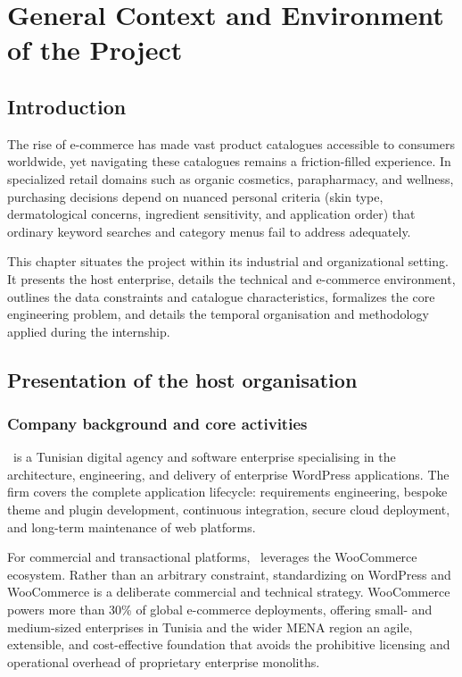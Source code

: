 ﻿%

\chapter{General Context and Environment of the Project}

\section{Introduction}

The rise of e-commerce has made vast product catalogues accessible to consumers worldwide, yet navigating these catalogues remains a friction-filled experience. In specialized retail domains such as organic cosmetics, parapharmacy, and wellness, purchasing decisions depend on nuanced personal criteria (skin type, dermatological concerns, ingredient sensitivity, and application order) that ordinary keyword searches and category menus fail to address adequately.

This chapter situates the project within its industrial and organizational setting. It presents the host enterprise, details the technical and e-commerce environment, outlines the data constraints and catalogue characteristics, formalizes the core engineering problem, and details the temporal organisation and methodology applied during the internship.

\section{Presentation of the host organisation}

\subsection{Company background and core activities}

\companyname\ is a Tunisian digital agency and software enterprise specialising in the architecture, engineering, and delivery of enterprise WordPress applications. The firm covers the complete application lifecycle: requirements engineering, bespoke theme and plugin development, continuous integration, secure cloud deployment, and long-term maintenance of web platforms.

For commercial and transactional platforms, \companyname\ leverages the WooCommerce ecosystem. Rather than an arbitrary constraint, standardizing on WordPress and WooCommerce is a deliberate commercial and technical strategy. WooCommerce powers more than 30\% of global e-commerce deployments, offering small- and medium-sized enterprises in Tunisia and the wider MENA region an agile, extensible, and cost-effective foundation that avoids the prohibitive licensing and operational overhead of proprietary enterprise monoliths.

